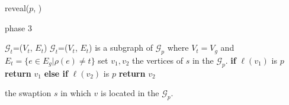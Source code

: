 \begin{enumerate}
\begin{algorithm} [H]
\begin{algorithmic}
        \State reveal($p$, \Aone)
        
    \EndIf
\end{algorithmic}
\end{algorithm}
    
    
    
    
    
    \begin{algorithm}[H]
    \centering
    \caption{phase 3}
    \label{algo:phase-3}
    \begin{algorithmic}
    \State $\mathcal{G}_{t}$=($V_t$, $E_t$) \Comment 
    $\mathcal{G}_{t}$=($V_t$, $E_t$) is a subgraph  of $\mathcal{G}_{p}$ where $V_t=V_g$ and $E_t=\{e \in E_g | \rho(e) \neq t\}$
        \State set $v_1, v_2$ the vertices of $s$ in the $\mathcal{G}_{p}$.
        \State \textbf{if} $\ell(v_1)$ is $p$ \textbf{return} $v_1$ \textbf{else if} $\ell(v_2)$ is $p$ \textbf{return} $v_2$
        \EndFunction
        
        \State \Return the swaption $s$ in which $v$ is located in the $\mathcal{G}_{p}$.
        \EndFunction
        

\end{algorithmic}
\end{algorithm}
\end{enumerate}
